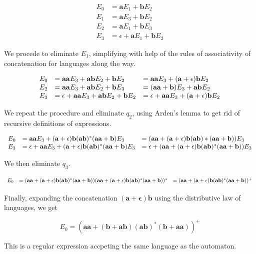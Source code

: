 \documentclass{article}
\begin{document}
\begin{enumerate}[(a)]
    \begin{align*}
        E_0 &= \mathbf{a}E_1 + \mathbf{b}E_2 \\
        E_1 &= \mathbf{a}E_3 + \mathbf{b}E_2 \\
        E_2 &= \mathbf{a}E_1 + \mathbf{b}E_3 \\
        E_3 &= \epsilon + \mathbf{a}E_1 + \mathbf{b}E_2
    \end{align*}

    We procede to eliminate $E_1$, simplifying with help of the rules of associativity of concatenation for languages along the way.

    \begin{equation*}
    \centering
    \begin{array}{l l l}
        E_0 &= \mathbf{aa}E_3 + \mathbf{ab}E_2 + \mathbf{b}E_2 &= \mathbf{aa}E_3 + (\mathbf{a} + \epsilon)\mathbf{b}E_2  \\
        E_2 &= \mathbf{aa}E_3 + \mathbf{ab}E_2 + \mathbf{b}E_3 &= (\mathbf{aa}+\mathbf{b})E_3 + \mathbf{ab}E_2\\
        E_3 &= \epsilon + \mathbf{aa}E_3 + \mathbf{ab}E_2 + \mathbf{b}E_2 &= \epsilon + \mathbf{aa}E_3 + (\mathbf{a}+\epsilon)\mathbf{b}E_2
    \end{array}
    \end{equation*}
    
    We repeat the procedure and eliminate $q_2$, using Arden's lemma to get rid of recursive definitions of expressions.

    \begin{equation*}
    \centering
    \begin{array}{l l l}
        E_0 &= \mathbf{aa}E_3 + (\mathbf{a}+\epsilon)\mathbf{b}(\mathbf{ab})^*(\mathbf{aa}+\mathbf{b})E_3 &= (\mathbf{aa} + (\mathbf{a}+\epsilon)\mathbf{b}(\mathbf{ab})*(\mathbf{aa}+\mathbf{b}))E_3 \\
        E_3 &= \epsilon + \mathbf{aa}E_3+ (\mathbf{a}+\epsilon)\mathbf{b}(\mathbf{ab})^*(\mathbf{aa}+\mathbf{b})E_3 &= \epsilon + (\mathbf{aa} + (\mathbf{a}+\epsilon)\mathbf{b}(\mathbf{ab})^*(\mathbf{aa}+\mathbf{b}))E_3
    \end{array}
    \end{equation*}

    We then eliminate $q_3$.

    \begin{equation*}
    \centering
    \begin{array}{l l l}
        E_0 &= (\mathbf{aa} + (\mathbf{a}+\epsilon)\mathbf{b}(\mathbf{ab})^*(\mathbf{aa}+\mathbf{b}))(\mathbf{aa} + (\mathbf{a}+\epsilon)\mathbf{b}(\mathbf{ab})^*(\mathbf{aa}+\mathbf{b}))^* &= (\mathbf{aa} + (\mathbf{a}+\epsilon)\mathbf{b}(\mathbf{ab})^*(\mathbf{aa}+\mathbf{b}))^+\\
    \end{array}
    \end{equation*}

    Finally, expanding the concatenation $\mathbf{(a+\epsilon)b}$ using the distributive law of languages, we get

    $$E_0 = \mathbf{(aa+(b+ab)(ab)^*(b+aa))^+}$$

    This is a regular expression accpeting the same language as the automaton.

\end{enumerate}
\end{document}
